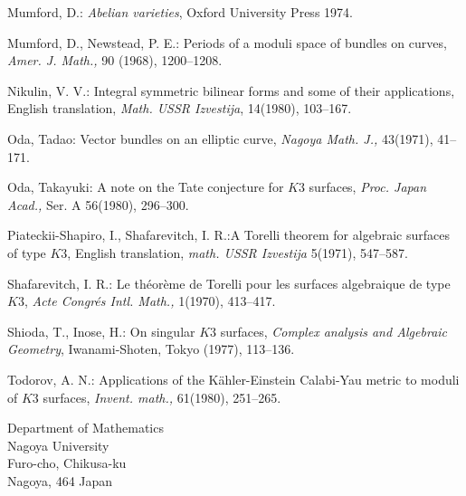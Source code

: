 \begin{thebibliography}{99}
{Mumford, D.}: \textit{Abelian varieties}, Oxford University
Press 1974.

{Mumford, D., Newstead, P. E.}: Periods of a moduli space of
bundles on curves, \textit{Amer. J. Math.,} 90 (1968), 1200--1208.

{Nikulin, V. V.}: Integral symmetric bilinear forms and some of
their applications, English translation, \textit{Math. USSR
  Izvestija}, 14(1980), 103--167.

{Oda, Tadao}: Vector bundles on an elliptic curve,
\textit{Nagoya Math. J.,} 43(1971), 41--171.

{Oda, Takayuki}: A note on the Tate conjecture for $K3$
surfaces, \textit{Proc. Japan Acad.,} Ser. A 56(1980), 296--300.

{Piateckii-Shapiro, I., Shafarevitch, I. R.}:\pageoriginale A Torelli theorem
for algebraic surfaces of type $K3$, English translation,
\textit{math. USSR Izvestija } 5(1971), 547--587.

{Shafarevitch, I. R.}: Le th\'{e}or\`{e}me de Torelli pour
les surfaces algebraique de type $K3$, \textit{Acte Congr\'{e}s
  Intl. Math.,} 1(1970), 413--417.

{Shioda, T., Inose, H.}: On singular $K3$ surfaces,
\textit{Complex analysis and Algebraic Geometry}, Iwanami-Shoten,
Tokyo (1977), 113--136.

{Todorov, A. N.}: Applications of the K\"{a}hler-Einstein
Calabi-Yau metric to moduli of $K3$ surfaces, \textit{Invent. math.,}
61(1980), 251--265.
\end{thebibliography}

\vskip 1cm

\noindent
Department of Mathematics\\
Nagoya University\\
Furo-cho, Chikusa-ku\\
Nagoya, 464 Japan

